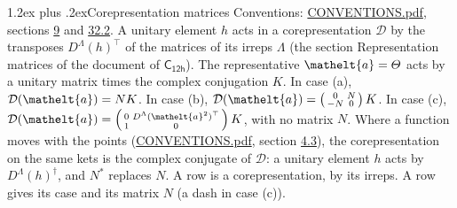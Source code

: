 \documentclass[10pt,a4paper]{article}
\makeatletter
\renewcommand\section{\@startsection{section}{1}{\z@}{-3ex plus -1ex minus -.2ex}%
  {1.2ex plus .2ex}{\normalfont\large\sffamily\bfseries\color{parttitle}}}
\numberwithin{equation}{section}
\newcommand{\eltfont}[1]{{\let\sigma\eltsigma\mathelt{#1}}}
\newcommand{\grp}[1]{\mathsf{#1}}
\newcommand{\elt}[1]{\eltfont{#1}}
\makeatother
\begin{document}
\section{Corepresentation matrices}\label{s:corep_matrices}
Conventions: \href{../../CONVENTIONS.pdf}{CONVENTIONS.pdf}, sections \href{../../../rotation/CONVENTIONS.pdf\#conv.9}{9} and \href{../../CONVENTIONS.pdf\#conv.32.2}{32.2}.
A unitary element $h$ acts in a corepresentation $\mathcal{D}$ by the transposes $D^{\Lambda}(h)^{\top}$ of the matrices of its irreps $\Lambda$ (the section Representation matrices of the document of \href{../../../rotation/data/pdf/C12h.pdf}{$\grp{C_{12h}}$}). The representative $\elt{a} = \varTheta$ acts by a unitary matrix times the complex conjugation $K$.
In case (a), $\mathcal{D}(\elt{a}) = NK$. In case (b), $\mathcal{D}(\elt{a}) = \left(\begin{smallmatrix} 0 & N \\ -N & 0 \end{smallmatrix}\right) K$. In case (c), $\mathcal{D}(\elt{a}) = \left(\begin{smallmatrix} 0 & D^{\Lambda}(\elt{a}^2)^{\top} \\ 1 & 0 \end{smallmatrix}\right) K$, with no matrix $N$.
Where a function moves with the points (\href{../../CONVENTIONS.pdf}{CONVENTIONS.pdf}, section \href{../../../rotation/CONVENTIONS.pdf\#conv.4.3}{4.3}), the corepresentation on the same kets is the complex conjugate of $\mathcal{D}$: a unitary element $h$ acts by $D^{\Lambda}(h)^{\dagger}$, and $N^{*}$ replaces $N$.
A row is a corepresentation, by its irreps. A row gives its case and its matrix $N$ (a dash in case (c)).
\end{document}
